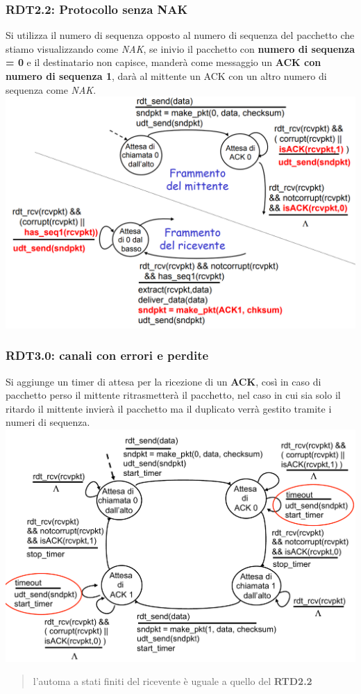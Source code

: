 \subsubsection*{RDT2.2: Protocollo senza NAK}
Si utilizza il numero di sequenza opposto al numero di sequenza del pacchetto che stiamo visualizzando come \textit{NAK}, se inivio il pacchetto con \textbf{numero di sequenza = 0} e il destinatario non capisce, manderà come messaggio un \textbf{ACK con numero di sequenza 1}, darà al mittente un ACK con un altro numero di sequenza come \textit{NAK}. \newline
\includegraphics[width=\textwidth]{./img/rdt2.2nonak.png}

\subsubsection*{RDT3.0: canali con errori e perdite}
Si aggiunge un timer di attesa per la ricezione di un \textbf{ACK}, così in caso di pacchetto perso il mittente ritrasmetterà il pacchetto, nel caso in cui sia solo il ritardo il mittente invierà il pacchetto ma il duplicato verrà gestito tramite i numeri di sequenza. \newline 
\includegraphics[width=\textwidth]{./img/rdt3.0mit.png} \newline
\begin{quote}
l'automa a stati finiti del ricevente è uguale a quello del \textbf{RTD2.2}
\end{quote}

